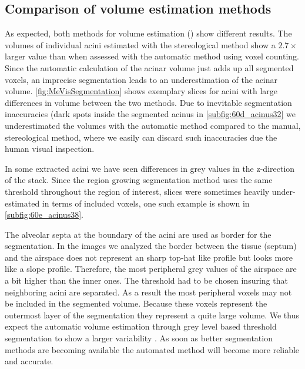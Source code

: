 \documentclass[final,paper=a4,DIV=calc,abstract,english]{scrartcl}
\newcommand{\difference}{2.7\xspace} %
\begin{document}
\subsection{Comparison of volume estimation methods}
As expected, both methods for volume estimation () show different results.
The volumes of individual acini estimated with the stereological method show a \(\difference\times\) larger value than when assessed with the automatic method using voxel counting.
Since the automatic calculation of the acinar volume  just adds up all segmented voxels, an imprecise segmentation leads to an underestimation of the acinar volume.
\autoref{fig:MeVisSegmentation} shows exemplary slices for acini with large differences in volume between the two methods.
Due to inevitable segmentation inaccuracies (dark spots inside the segmented acinus in \autoref{subfig:60d_acinus32} we underestimated the volumes with the automatic method compared to the manual, stereological method, where we easily can discard such inaccuracies due the human visual inspection.

In some extracted acini we have seen differences in grey values in the z-direction of the stack.
Since the region growing segmentation method uses the same threshold throughout the region of interest, slices were sometimes heavily under-estimated in terms of included voxels, one such example is shown in \autoref{subfig:60e_acinus38}.

The alveolar septa at the boundary of the acini are used as border for the segmentation.
In the images we analyzed the border between the tissue (septum) and the airspace does not represent an sharp top-hat like profile but looks more like a slope profile.
Therefore, the most peripheral grey values of the airspace are a bit higher than the inner ones.
The threshold had to be chosen insuring that neighboring acini are separated.
As a result the most peripheral voxels may not be included in the segmented volume.
Because these voxels represent the outermost layer of the segmentation they represent a quite large volume.
We thus expect the automatic volume estimation through grey level based threshold segmentation to show a larger variability .
As soon as better segmentation methods are becoming available the automated method will become more reliable and accurate.
\end{document}
